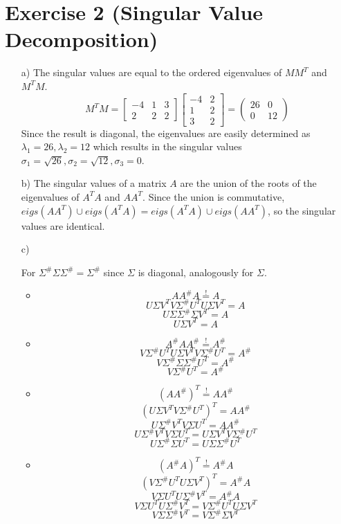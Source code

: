 \documentclass[10pt]{article}
\numberwithin{equation}{section}
\begin{document}
\section*{Exercise 2 (Singular Value Decomposition)}
\begin{enumerate}
\item[a)]{
    The singular values are equal to the ordered eigenvalues of $MM^T$ and $M^TM$.
    $$M^TM = \begin{bmatrix}-4&1&3\\ 2&2&2\end{bmatrix}\begin{bmatrix}-4&2\\ 1&2 \\3&2\end{bmatrix} = \begin{pmatrix}26 & 0\\ 0&12\end{pmatrix}$$
    Since the result is diagonal, the eigenvalues are easily determined as $\lambda_1=26, \lambda_2=12$ which results in the singular values $\sigma_1 = \sqrt{26}, \sigma_2 = \sqrt{12}, \sigma_3 = 0$.
  }
\item[b)]{
    The singular values of a matrix $A$ are the union of the roots of the eigenvalues of $A^TA$ and $AA^T$. Since the union is commutative, $eigs(AA^T) \cup eigs(A^TA) = eigs(A^TA) \cup eigs(AA^T)$, so the singular values are identical.
  }
\item[c)]{
    For $\Sigma^\# \Sigma \Sigma^\# = \Sigma^\#$ since $\Sigma$ is diagonal, analogously for $\Sigma$.
    \begin{itemize}
      \item{
        $$AA^\#A \overset{!}= A$$
        $$U\Sigma V^T V \Sigma^\# U^T U\Sigma V^T = A$$
        $$U\Sigma \Sigma^\# \Sigma V^T = A$$
        $$U \Sigma V^T = A$$
      }
    \item{
        $$A^\# A A^\# \overset{!}{=} A^\#$$
        $$V\Sigma^\# U^T U\Sigma V^T V\Sigma^\# U^T = A^\#$$
        $$V\Sigma^\# \Sigma \Sigma^\# U^T = A^\#$$
        $$V\Sigma^\# U^T = A^\#$$
  
      }
    \item{
        $$(A A^\#)^T \overset{!}{=} A A^\#$$
        $$(U\Sigma V^T V \Sigma^\# U^T)^T = A A^\#$$
        $$U\Sigma^\# V^T V \Sigma U^T = A A^\# $$
        $$U\Sigma^\# V^T V \Sigma U^T = U\Sigma V^T V \Sigma^\# U^T $$
        $$U\Sigma^\# \Sigma U^T = U\Sigma \Sigma^\# U^T $$
      }
    \item{
        $$(A^\# A)^T \overset{!}{=} A^\# A$$
        $$(V\Sigma^\# U^T U \Sigma V^T)^T = A^\# A$$
        $$V\Sigma U^T U \Sigma^\# V^T = A^\# A$$
        $$V\Sigma U^T U \Sigma^\# V^T = V\Sigma^\# U^T U \Sigma V^T $$
        $$V\Sigma \Sigma^\# V^T = V\Sigma^\# \Sigma V^T $$
      }
    \end{itemize}
}
\end{enumerate}
\end{document}
